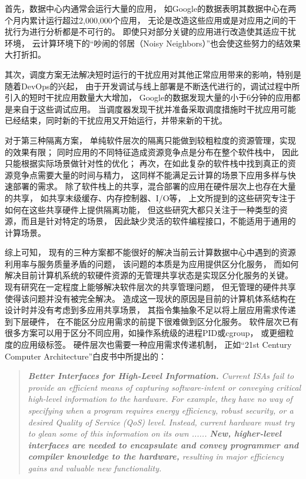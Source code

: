 首先，数据中心内通常会运行大量的应用，
如Google的数据\cite{Reiss_googletrace_2012}表明其数据中心在两个月内累计运行超过2,000,000个应用，
无论是改造这些应用或是对应用之间的干扰行为进行分析都是不可行的。
即使只对部分关键的应用进行改造使其适应干扰环境，
云计算环境下的``吵闹的邻居（Noisy Neighbors）''也会使这些努力的结效果大打折扣。

其次，调度方案无法解决短时运行的干扰应用对其他正常应用带来的影响，特别是随着DevOps的兴起，
由于开发调试与线上部署是不断迭代进行的，调试过程中所引入的短时干扰应用数量大大增加，
Google的数据\cite{Reiss_googletrace_2012}发现大量的小于6分钟的应用都是来自于这些调试应用。
当调度器发现干扰并准备采取调度措施时干扰应用可能已经结束，同时新的干扰应用又开始运行，并带来新的干扰。

对于第三种隔离方案，
单纯软件层次的隔离只能做到较粗粒度的资源管理，实现的效果有限；
同时应用的不同特征造成资源竞争点是分布在整个软件栈中，
因此只能根据实际场景做针对性的优化；
再次，在如此复杂的软件栈中找到真正的资源竞争点需要大量的时间与精力，
这同样不能满足云计算的场景下应用多样与快速部署的需求。
除了软件栈上的共享，混合部署的应用在硬件层次上也存在大量的共享，
如共享末级缓存、内存控制器、I/O等，
上文所提到的这些研究专注于如何在这些共享硬件上提供隔离功能，
但这些研究大都只关注于一种类型的资源，而且是针对特定的场景，
因此缺少灵活的软件编程接口，不能适用于通用的计算场景。

综上可知，
现有的三种方案都不能很好的解决当前云计算数据中心中遇到的资源利用率与服务质量矛盾的问题，
该问题的本质是为应用提供区分化服务，
而如何解决目前计算机系统的软硬件资源的无管理共享状态是实现区分化服务的关键。
现有研究在一定程度上能够解决软件层次的共享管理问题，
但无管理的硬件共享使得该问题并没有被完全解决。
造成这一现状的原因是目前的计算机体系结构在设计时并没有考虑到多应用共享场景，
其指令集抽象不足以将上层应用需求传递到下层硬件，
在不能区分应用需求的前提下很难做到区分化服务。
软件层次已有很多方案可以用于区分不同应用，如操作系统级的进程PID或cgroup，
或更细粒度的应用级标签\cite{timecard:2013,d2p:2014, mesnier_differentiated_2011, thereska_ioflow:_2013}。
硬件层次也需要一种应用需求传递机制，
正如``21st Century Computer Architecture''白皮书中所提出的：

\begin{quotation} 
\emph{\textbf{Better Interfaces for High-Level Information.}
Current ISAs fail to provide an efficient means of capturing software-intent or conveying critical high-level information to the hardware.
For example, they have no way of specifying when a program requires energy efficiency, robust security, or a desired Quality of Service (QoS) level.
Instead, current hardware must try to glean some of this information on its own ......
\textbf{New, higher-level interfaces are needed to encapsulate and convey programmer and compiler knowledge to the hardware,}
resulting in major efficiency gains and valuable new functionality.}\cite{21st_architecture}
\end{quotation}

